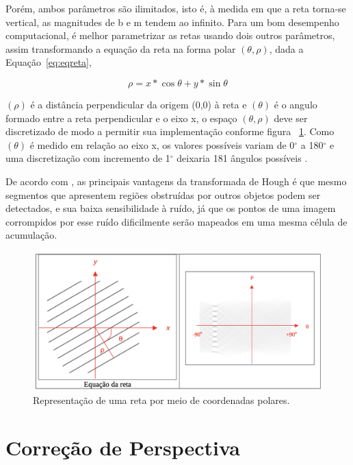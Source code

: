 Porém, ambos parâmetros são ilimitados, isto é, à medida em que a reta torna-se vertical, as magnitudes de b e m tendem ao infinito. Para um bom desempenho computacional, é melhor parametrizar as retas usando dois outros parâmetros, assim transformando a equação da reta na forma polar $(\theta, \rho)$, dada a Equação~\ref{eq:eqreta},

\begin{equation}
\rho = x*\cos{\theta} + y*\sin{\theta}
\label{eq:eqreta}
\end{equation}

$(\rho)$ é a distância perpendicular da origem (0,0) à reta e $(\theta)$ é o angulo formado entre a reta perpendicular e o eixo x, o espaço $(\theta, \rho)$ deve ser discretizado de modo a permitir sua implementação conforme figura ~\ref{fig:eqreta}. Como $(\theta)$ é medido em relação ao eixo x, os valores possíveis variam de 0$^{\circ}$ a 180$^{\circ}$ e uma discretização com incremento de 1$^{\circ}$ deixaria 181 ângulos possíveis \cite{PEDRINI2008}.

De acordo com , as principais vantagens da transformada de Hough é que mesmo segmentos que apresentem regiões obstruídas por outros objetos podem ser detectados, e sua baixa sensibilidade à ruído, já que os pontos de uma imagem corrompidos por esse ruído dificilmente serão mapeados em uma mesma célula de acumulação.

 \begin{figure}[h!]
	\centering
	\includegraphics[width=1.0\textwidth]{Imagens/eqreta} 
	\caption[Representação de uma reta por meio de coordenadas polares.]{Representação de uma reta por meio de coordenadas polares.}
	\label{fig:eqreta}
\end{figure}


\section{Correção de Perspectiva}

